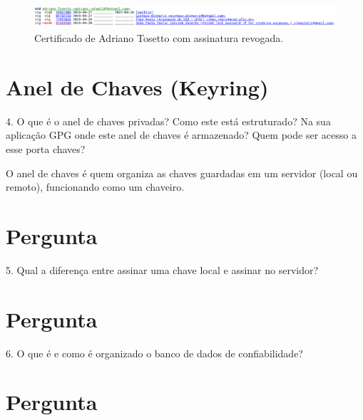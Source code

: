 \documentclass{article}
\begin{document}
    \begin{figure}[h]
        \centering
        \includegraphics[keepaspectratio,width=1\textwidth]{tosetto-revoked-sig}
        \caption{%
            Certificado de Adriano Tosetto com assinatura
            revogada.\label{fig:revokeed-sign}
        }
    \end{figure}

    \section{Anel de Chaves (Keyring)}

    \begin{superframe}
        4. O que é o anel de chaves privadas? Como este está estruturado? Na
        sua aplicação GPG onde este anel de chaves é armazenado? Quem pode ser
        acesso a esse porta chaves?
    \end{superframe}

    O anel de chaves é quem organiza as chaves guardadas em um servidor (local
    ou remoto), funcionando como um chaveiro.

    \section{Pergunta}

    \begin{superframe}
        5. Qual a diferença entre assinar uma chave local e assinar no
        servidor?
    \end{superframe}

    \section{Pergunta}

    \begin{superframe}
        6. O que é e como é organizado o banco de dados de confiabilidade?
    \end{superframe}

    \section{Pergunta}
\end{document}
